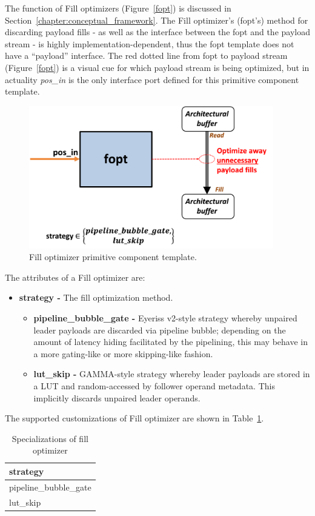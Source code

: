 The function of Fill optimizers (Figure~\ref{fopt}) is discussed in Section~\ref{chapter:conceptual_framework}. The Fill optimizer's (fopt's) method for discarding payload fills - as well as the interface between the fopt and the payload stream - is highly implementation-dependent, thus the fopt template does not have a ``payload'' interface. The red dotted line from fopt to payload stream (Figure~\ref{fopt}) is a visual cue for which payload stream is being optimized, but in actuality \textit{pos\_in} is the only interface port defined for this primitive component template.

\begin{figure}[H]
    \centering
    \includegraphics[width=0.95\textwidth]{figures/fopt.png}
    \caption{Fill optimizer primitive component template. }
    \label{fig:fopt}
\end{figure}

The attributes of a Fill optimizer are:

\begin{itemize}
    \item \textbf{strategy -} The fill optimization method.
    \begin{itemize}
    \item \textbf{pipeline\_bubble\_gate -} Eyeriss v2-style\cite{eyerissv2} strategy whereby unpaired leader payloads are discarded via pipeline bubble; depending on the amount of latency hiding facilitated by the pipelining, this may behave in a more gating-like or more skipping-like fashion.
    \item \textbf{lut\_skip -} GAMMA-style\cite{gamma} strategy whereby leader payloads are stored in a LUT and random-accessed by follower operand metadata. This implicitly discards unpaired leader operands.
    \end{itemize}
\end{itemize}

The supported customizations of Fill optimizer are shown in Table~\ref{tab:FillOptimizer_specializations}.

\begin{table}[H]
\centering
\begin{tabular}{l}
\toprule
 strategy             \\
\midrule
 pipeline\_bubble\_gate \\
 lut\_skip             \\
\bottomrule
\end{tabular}
\caption{Specializations of fill optimizer}
\label{tab:FillOptimizer_specializations}
\end{table}